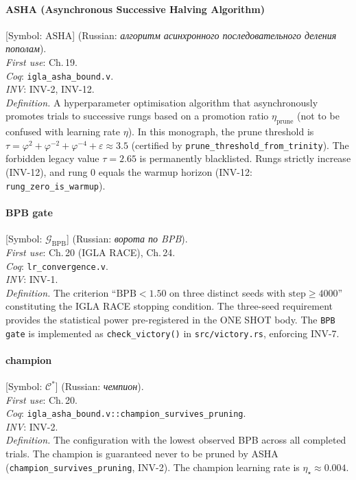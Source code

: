\paragraph*{\textmd{\textbf{ASHA (Asynchronous Successive Halving Algorithm)}}}
\label{entry:asha}
[Symbol: $\mathrm{ASHA}$] (Russian: \textit{алгоритм асинхронного последовательного деления пополам}).\\
\textit{First use}: Ch.\,19.\\
\textit{Coq}: \texttt{igla\_asha\_bound.v}.\\
\textit{INV}: INV-2, INV-12.\\
\textit{Definition.}
A hyperparameter optimisation algorithm that asynchronously
promotes trials to successive rungs based on a promotion ratio
$\eta_{\mathrm{prune}}$ (not to be confused with learning rate $\eta$).
In this monograph, the prune threshold is
$\tau = \varphi^2 + \varphi^{-2} + \varphi^{-4} + \varepsilon \approx 3.5$
(certified by \texttt{prune\_threshold\_from\_trinity}).
The forbidden legacy value $\tau=2.65$ is permanently blacklisted.
Rungs strictly increase (INV-12), and rung 0 equals the warmup
horizon (INV-12: \texttt{rung\_zero\_is\_warmup}).

\paragraph*{\textmd{\textbf{BPB gate}}}
\label{entry:bpb-gate}
[Symbol: $\mathcal{G}_{\mathrm{BPB}}$] (Russian: \textit{ворота по BPB}).\\
\textit{First use}: Ch.\,20 (IGLA RACE), Ch.\,24.\\
\textit{Coq}: \texttt{lr\_convergence.v}.\\
\textit{INV}: INV-1.\\
\textit{Definition.}
The criterion ``$\mathrm{BPB} < 1.50$ on three distinct seeds with
$\mathrm{step} \ge 4000$'' constituting the IGLA RACE stopping condition.
The three-seed requirement provides the statistical power
pre-registered in the ONE SHOT body.
The \texttt{BPB gate} is implemented as \texttt{check\_victory()} in
\texttt{src/victory.rs}, enforcing INV-7.

\paragraph*{\textmd{\textbf{champion}}}
\label{entry:champion}
[Symbol: $\mathcal{C}^*$] (Russian: \textit{чемпион}).\\
\textit{First use}: Ch.\,20.\\
\textit{Coq}: \texttt{igla\_asha\_bound.v::champion\_survives\_pruning}.\\
\textit{INV}: INV-2.\\
\textit{Definition.}
The configuration with the lowest observed BPB across all completed
trials.
The champion is guaranteed never to be pruned by ASHA
(\texttt{champion\_survives\_pruning}, INV-2).
The champion learning rate is $\eta_\star \approx 0.004$.

